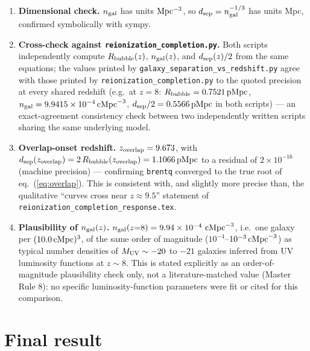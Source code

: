 \documentclass[11pt,a4paper]{article}
\newcommand{\pMpc}{\,{\rm pMpc}}
\newcommand{\cMpc}{\,{\rm cMpc}}
\begin{document}
\begin{enumerate}
\item \textbf{Dimensional check.} $n_{\rm gal}$ has units ${\rm Mpc^{-3}}$, so $d_{\rm sep}=n_{\rm
      gal}^{-1/3}$ has units Mpc, confirmed symbolically with sympy.
\item \textbf{Cross-check against \texttt{reionization\_completion.py}.} Both scripts independently compute
      $R_{\rm bubble}(z)$, $n_{\rm gal}(z)$, and $d_{\rm sep}(z)/2$ from the same equations; the values printed
      by \texttt{galaxy\_separation\_vs\_redshift.py} agree with those printed by
      \texttt{reionization\_completion.py} to the quoted precision at every shared redshift (e.g.\ at $z=8$:
      $R_{\rm bubble}=0.7521\pMpc$, $n_{\rm gal}=9.9415\times10^{-4}\cMpc^{-3}$, $d_{\rm sep}/2=0.5566\pMpc$
      in both scripts) --- an exact-agreement consistency check between two independently written scripts
      sharing the same underlying model.
\item \textbf{Overlap-onset redshift.} $z_{\rm overlap}=9.673$, with
      $d_{\rm sep}(z_{\rm overlap})=2\,R_{\rm bubble}(z_{\rm overlap})=1.1066\pMpc$ to a residual of
      $2\times10^{-16}$ (machine precision) --- confirming \texttt{brentq} converged to the true root of
      eq.~(\ref{eq:overlap}). This is consistent with, and slightly more precise than, the qualitative
      ``curves cross near $z\approx9.5$'' statement of \texttt{reionization\_completion\_response.tex}.
\item \textbf{Plausibility of $n_{\rm gal}(z)$.} $n_{\rm gal}(z{=}8)=9.94\times10^{-4}\,\cMpc^{-3}$, i.e.\ one
      galaxy per $(10.0\cMpc)^3$, of the same order of magnitude ($10^{-4}$--$10^{-3}\cMpc^{-3}$) as typical
      number densities of $M_{\rm UV}\sim-20$ to $-21$ galaxies inferred from UV luminosity functions at
      $z\sim8$. This is stated explicitly as an order-of-magnitude plausibility check only, not a
      literature-matched value (Master Rule 8): no specific luminosity-function parameters were fit or cited
      for this comparison.
\end{enumerate}

\section{Final result}
\label{sec:final}
\end{document}
